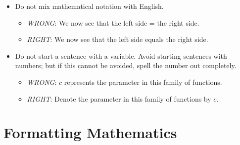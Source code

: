 \documentclass[11pt]{article}
\begin{document}
\begin{itemize}
	\item Do not mix mathematical notation with English. 
	\begin{itemize}
		\item \emph{WRONG}: We now see that the left side = the right side. 
		\item \emph{RIGHT}: We now see that the left side equals the right side. 
	\end{itemize}
	
	\item Do not start a sentence with a variable. Avoid starting sentences with numbers; but if this cannot be avoided, spell the number out completely. 
	\begin{itemize}
		\item \emph{WRONG}: $c$ represents the parameter in this family of functions. 
		\item \emph{RIGHT}: Denote the parameter in this family of functions by $c$. 
	\end{itemize}
	
	
\end{itemize}


\section*{Formatting Mathematics}
\end{document}
